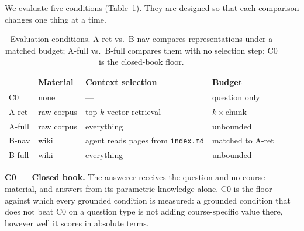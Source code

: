 \documentclass[letterpaper]{article} %
\begin{document}
We evaluate five conditions (Table~\ref{tab:conditions}). They are designed so that each comparison changes one thing at a time.

\begin{table}[t]
\centering
\small
\setlength{\tabcolsep}{3pt}
\begin{tabular}{@{}l p{1.55cm} p{2.2cm} p{2.0cm}@{}}
\toprule
 & Material & Context selection & Budget \\
\midrule
C0 & none & --- & question only \\
A-ret & raw corpus & top-$k$ vector retrieval & $k{\times}$chunk \\
A-full & raw corpus & everything & unbounded \\
B-nav & wiki & agent reads pages from \texttt{index.md} & matched to A-ret \\
B-full & wiki & everything & unbounded \\
\bottomrule
\end{tabular}
\caption{Evaluation conditions. A-ret vs.\ B-nav compares representations under a matched budget; A-full vs.\ B-full compares them with no selection step; C0 is the closed-book floor.}
\label{tab:conditions}
\end{table}

\textbf{C0 --- Closed book.} The answerer receives the question and no course material, and answers from its parametric knowledge alone. C0 is the floor against which every grounded condition is measured: a grounded condition that does not beat C0 on a question type is not adding course-specific value there, however well it scores in absolute terms.
\end{document}
